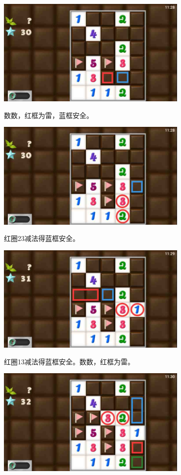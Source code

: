 \begin{center}
    \includegraphics[width=0.7\textwidth]{puzzlelow/216-4.jpg}
\end{center}
数数，红框为雷，蓝框安全。
\begin{center}
    \includegraphics[width=0.7\textwidth]{puzzlelow/216-5.jpg}
\end{center}
红圈23减法得蓝框安全。
\begin{center}
    \includegraphics[width=0.7\textwidth]{puzzlelow/216-6.jpg}
\end{center}
红圈13减法得蓝框安全。数数，红框为雷。
\begin{center}
    \includegraphics[width=0.7\textwidth]{puzzlelow/216-7.jpg}
\end{center}
